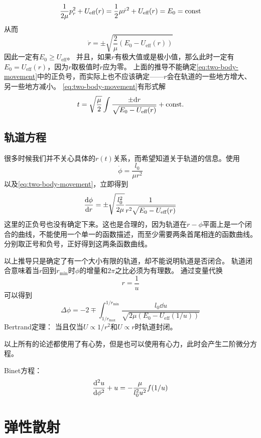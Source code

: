 \[
    \frac{1}{2 \mu} p_r^2 + U_\text{eff}(r) = \frac{1}{2} \mu \dot{r}^2 + U_\text{eff}(r) = E_0 = \mathrm{const}
\]
从而
\begin{equation}
    \dot{r} = \pm \sqrt{\frac{2}{\mu} (E_0 - U_\text{eff}(r))}
    \label{eq:two-body-movement}
\end{equation}
因此一定有$E_0 \geq U_\text{eff}$。
并且，如果$r$有极大值或是极小值，那么此时一定有$E_0 = U_\text{eff}(r)$，因为$r$取极值时$\dot{r}$应为零。
上面的推导不能确定\eqref{eq:two-body-movement}中的正负号，而实际上也不应该确定——$r$会在轨道的一些地方增大、另一些地方减小。
\eqref{eq:two-body-movement}有形式解
\begin{equation}
    t = \sqrt{\frac{\mu}{2}} \int \frac{\pm \dd r}{\sqrt{E_0 - U_\text{eff}(r)}} + \mathrm{const}.
\end{equation}

\subsection{轨道方程}

很多时候我们并不关心具体的$r(t)$关系，而希望知道关于轨道的信息。使用
\[
    \dot{\phi} = \frac{l_0}{\mu r^2}
\]
以及\eqref{eq:two-body-movement}，立即得到
\begin{equation}
    \dv{\phi}{r} = \pm \sqrt{\frac{l_0^2}{2\mu}} \frac{1}{r^2 \sqrt{E_0 - U_\text{eff}(r)}}
    \label{eq:two-body-orbit}
\end{equation}
这里的正负号也没有确定下来。这也是合理的，因为轨道在$r-\phi$平面上是一个闭合的曲线，不能使用一个单一的函数描述，而至少需要两条首尾相连的函数曲线。分别取正号和负号，正好得到这两条函数曲线。

以上推导只是确定了有一个大小有限的轨道，却不能说明轨道是否闭合。
轨道闭合意味着当$r$回到$r_\text{min}$时$\phi$的增量和$2\pi$之比必须为有理数。
通过变量代换
\begin{equation}
    r = \frac{1}{u}
\end{equation}
可以得到
\[
    \Delta \phi = - 2 \mp \int_{1/r_\text{max}}^{1/r_\text{min}} \frac{l_0 \dd u}{\sqrt{2\mu (E_0 - U_\text{eff}(1/u))}}
\]
Bertrand定理：
当且仅当$U \propto 1/r^2$和$U \propto r$时轨道封闭。

以上所有的论述都使用了有心势，但是也可以使用有心力，此时会产生二阶微分方程。

Binet方程：
\begin{equation}
    \dv[2]{u}{\phi} + u = - \frac{\mu}{l_0^2 u^2} f(1/u)
\end{equation}

\section{弹性散射}

